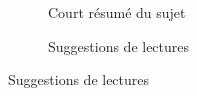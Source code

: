 \documentclass[
  letterpaper,
  DIV=11,
  numbers=noendperiod]{scrreprt}
\begin{document}
\begin{figure}

\begin{minipage}{0.50\linewidth}

\begin{figure}[H]


\caption{\label{fig-results1}Court résumé du sujet}

\end{figure}%

\end{minipage}%
%
\begin{minipage}{0.50\linewidth}

\begin{figure}[H]


\caption{\label{fig-results2}Suggestions de lectures}

\end{figure}%

\end{minipage}%

\end{figure}%
\end{document}
